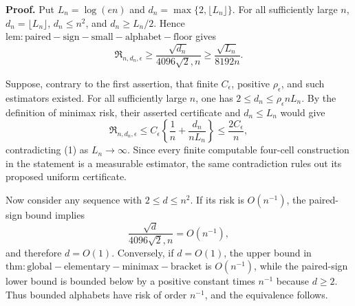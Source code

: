 \textbf{Proof.}
Put \(L_n=\log(en)\) and
\(d_n=\max\{2,\lfloor L_n\rfloor\}\).  For all sufficiently large \(n\),
\(d_n=\lfloor L_n\rfloor\), \(d_n\leq n^2\), and
\(d_n\geq L_n/2\).  Hence
\(\mathrm{lem:paired-sign-small-alphabet-floor}\) gives
\[
 \mathfrak R_{n,d_n,\epsilon}
 \geq\frac{\sqrt{d_n}}{4096\sqrt2,n}
 \geq\frac{\sqrt{L_n}}{8192n}.
 \tag{1}
\]

Suppose, contrary to the first assertion, that finite \(C_\epsilon\), positive
\(\rho_\epsilon\), and such estimators existed.  For all sufficiently large
\(n\), one has \(2\leq d_n\leq\rho_\epsilon nL_n\).  By the definition of minimax risk, their asserted certificate and \(d_n\leq L_n\) would give
\[
 \mathfrak R_{n,d_n,\epsilon}
 \leq C_\epsilon\left\{
       \frac1n+\frac{d_n}{nL_n}
      \right\}
 \leq\frac{2C_\epsilon}{n},
\]
contradicting (1) as \(L_n\to\infty\).  Since every finite computable four-cell construction in the statement is a measurable estimator, the same contradiction rules out its proposed uniform certificate.

Now consider any sequence with \(2\leq d\leq n^2\).  If its risk is
\(O(n^{-1})\), the paired-sign bound implies
\[
 \frac{\sqrt d}{4096\sqrt2,n}=O(n^{-1}),
\]
and therefore \(d=O(1)\).  Conversely, if \(d=O(1)\), the upper bound in
\(\mathrm{thm:global-elementary-minimax-bracket}\) is \(O(n^{-1})\), while the paired-sign lower bound is bounded below by a positive constant times \(n^{-1}\) because \(d\geq2\).  Thus bounded alphabets have risk of order \(n^{-1}\), and the equivalence follows.